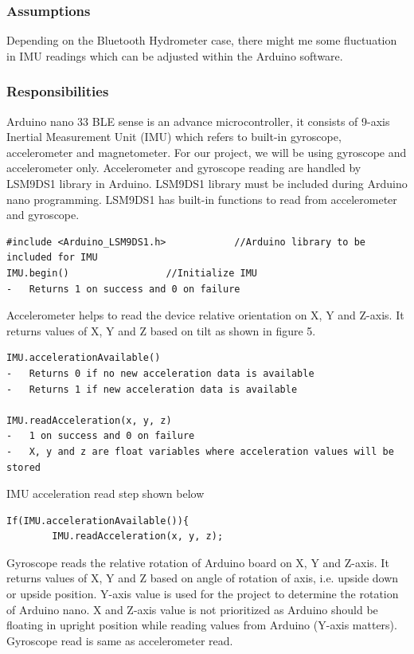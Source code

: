 \subsubsection{Assumptions}
Depending on the Bluetooth Hydrometer case, there might me some fluctuation in IMU readings which can be adjusted within the Arduino software.

\subsubsection{Responsibilities}
Arduino nano 33 BLE sense is an advance microcontroller, it consists of 9-axis Inertial Measurement Unit (IMU) which refers to built-in gyroscope, accelerometer and magnetometer. For our project, we will be using gyroscope and accelerometer only. Accelerometer and gyroscope reading are handled by LSM9DS1 library in Arduino. LSM9DS1 library must be included during Arduino nano programming. LSM9DS1 has built-in functions to read from accelerometer and gyroscope.

\begin{lstlisting}
#include <Arduino_LSM9DS1.h>			//Arduino library to be included for IMU
IMU.begin()					//Initialize IMU
-	Returns 1 on success and 0 on failure
\end{lstlisting}

Accelerometer helps to read the device relative orientation on X, Y and Z-axis. It returns values of X, Y and Z based on tilt as shown in figure 5. 

\begin{lstlisting}
IMU.accelerationAvailable()
-	Returns 0 if no new acceleration data is available
-	Returns 1 if new acceleration data is available

IMU.readAcceleration(x, y, z)
-	1 on success and 0 on failure
-	X, y and z are float variables where acceleration values will be stored
\end{lstlisting}

IMU acceleration read step shown below

\begin{lstlisting}
If(IMU.accelerationAvailable()){
		IMU.readAcceleration(x, y, z);
\end{lstlisting}

Gyroscope reads the relative rotation of Arduino board on X, Y and Z-axis. It returns values of X, Y and Z based on angle of rotation of axis, i.e. upside down or upside position. Y-axis value is used for the project to determine the rotation of Arduino nano. X and Z-axis value is not prioritized as Arduino should be floating in upright position while reading values from Arduino (Y-axis matters).
Gyroscope read is same as accelerometer read.

